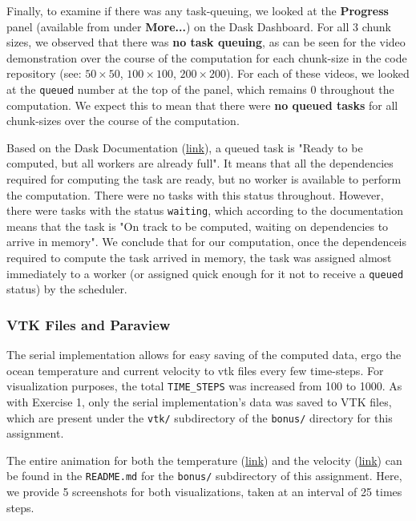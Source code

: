 \documentclass[a4paper,12pt]{article}
\begin{document}
\begin{itemize}
  Finally, to examine if there was any task-queuing, we looked at the \textbf{Progress} panel (available from under \textbf{More...}) on the Dask Dashboard.
  For all 3 chunk sizes, we observed that there was \textbf{no task queuing}, as can be seen for the video demonstration over the course of the computation for each chunk-size in the code repository (see: \href{https://github.com/paulmyr/DD2358-HPC25/tree/master/04_parallel/bonus#chunk-size-50-1}{$50 \times 50$}, \href{https://github.com/paulmyr/DD2358-HPC25/tree/master/04_parallel/bonus#chunk-size-100-1}{$100 \times 100$}, \href{https://github.com/paulmyr/DD2358-HPC25/tree/master/04_parallel/bonus#chunk-size-200-1}{$200 \times 200$}).
  For each of these videos, we looked at the \verb|queued| number at the top of the panel, which remains 0 throughout the computation.
  We expect this to mean that there were \textbf{no queued tasks} for all chunk-sizes over the course of the computation.

  Based on the Dask Documentation (\href{https://distributed.dask.org/en/stable/scheduling-state.html#task-state}{link}), a queued task is "Ready to be computed, but all workers are already full".
  It means that all the dependencies required for computing the task are ready, but no worker is available to perform the computation.
  There were no tasks with this status throughout.
  However, there were tasks with the status \verb|waiting|, which according to the documentation means that the task is "On track to be computed, waiting on dependencies to arrive in memory".
  We conclude that for our computation, once the dependenceis required to compute the task arrived in memory, the task was assigned almost immediately to a worker (or assigned quick enough for it not to receive a \verb|queued| status) by the scheduler.
\end{itemize}

\subsubsection{VTK Files and Paraview}
The serial implementation allows for easy saving of the computed data, ergo the ocean temperature and current velocity to vtk files every few time-steps.
For visualization purposes, the total \verb|TIME_STEPS| was increased from 100 to 1000.
As with Exercise 1, only the serial implementation's data was saved to VTK files, which are present under the \verb|vtk/| subdirectory of the \verb|bonus/| directory for this assignment.

The entire animation for both the temperature (\href{https://github.com/paulmyr/DD2358-HPC25/blob/master/04_parallel/bonus/README.md#temperature-visualization}{link}) and the velocity (\href{https://github.com/paulmyr/DD2358-HPC25/blob/master/04_parallel/bonus/README.md#velocity-visualization}{link}) can be found in the \verb|README.md| for the \verb|bonus/| subdirectory of this assignment.
Here, we provide 5 screenshots for both visualizations, taken at an interval of 25 times steps. 
\end{document}
